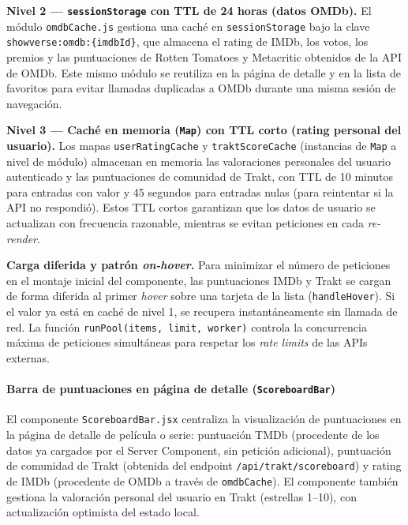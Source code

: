 \documentclass[
]{article}
\begin{document}
\textbf{Nivel 2 --- \texttt{sessionStorage} con TTL de 24 horas (datos
OMDb).} El módulo \texttt{omdbCache.js} gestiona una caché en
\texttt{sessionStorage} bajo la clave
\texttt{showverse:omdb:\{imdbId\}}, que almacena el rating de IMDb, los
votos, los premios y las puntuaciones de Rotten Tomatoes y Metacritic
obtenidos de la API de OMDb. Este mismo módulo se reutiliza en la página
de detalle y en la lista de favoritos para evitar llamadas duplicadas a
OMDb durante una misma sesión de navegación.

\textbf{Nivel 3 --- Caché en memoria (\texttt{Map}) con TTL corto
(rating personal del usuario).} Los mapas \texttt{userRatingCache} y
\texttt{traktScoreCache} (instancias de \texttt{Map} a nivel de módulo)
almacenan en memoria las valoraciones personales del usuario autenticado
y las puntuaciones de comunidad de Trakt, con TTL de 10 minutos para
entradas con valor y 45 segundos para entradas nulas (para reintentar si
la API no respondió). Estos TTL cortos garantizan que los datos de
usuario se actualizan con frecuencia razonable, mientras se evitan
peticiones en cada \emph{re-render}.

\textbf{Carga diferida y patrón \emph{on-hover}.} Para minimizar el
número de peticiones en el montaje inicial del componente, las
puntuaciones IMDb y Trakt se cargan de forma diferida al primer
\emph{hover} sobre una tarjeta de la lista (\texttt{handleHover}). Si el
valor ya está en caché de nivel 1, se recupera instantáneamente sin
llamada de red. La función \texttt{runPool(items,\ limit,\ worker)}
controla la concurrencia máxima de peticiones simultáneas para respetar
los \emph{rate limits} de las APIs externas.

\hypertarget{barra-de-puntuaciones-en-puxe1gina-de-detalle-scoreboardbar}{%
\paragraph{\texorpdfstring{Barra de puntuaciones en página de detalle
(\texttt{ScoreboardBar})}{Barra de puntuaciones en página de detalle (ScoreboardBar)}}\label{barra-de-puntuaciones-en-puxe1gina-de-detalle-scoreboardbar}}

El componente \texttt{ScoreboardBar.jsx} centraliza la visualización de
puntuaciones en la página de detalle de película o serie: puntuación
TMDb (procedente de los datos ya cargados por el Server Component, sin
petición adicional), puntuación de comunidad de Trakt (obtenida del
endpoint \texttt{/api/trakt/scoreboard}) y rating de IMDb (procedente de
OMDb a través de \texttt{omdbCache}). El componente también gestiona la
valoración personal del usuario en Trakt (estrellas 1--10), con
actualización optimista del estado local.
\end{document}
